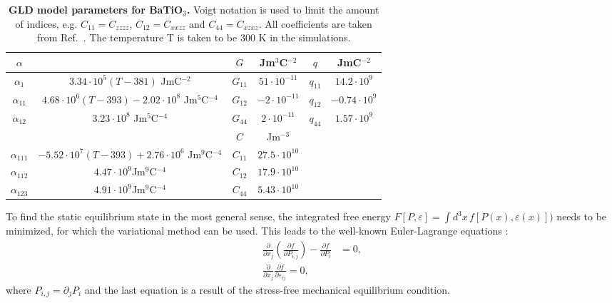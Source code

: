 \begin{table}
\begin{tabular}{|c|c|c|c|c|c|}
	\hline
	 $\alpha$ & & $G$ & Jm$^3$C$^{-2}$& $q$ & JmC$^{-2}$\\
	 \hline
	 $\alpha_1$ & $3.34\cdot 10^5 (T - 381)$  JmC$^{-2}$& $G_{11}$ & $51 \cdot 10^{-11}$ & $q_{11}$ & $14.2 \cdot 10^{9}$ \\
	 $\alpha_{11}$ & $4.68 \cdot 10^6 (T-393) - 2.02 \cdot 10^8$ Jm$^5$C$^{-4}$& $G_{12}$ & $-2 \cdot 10^{-11}$ & $q_{12}$ & $-0.74 \cdot 10^{9}$ \\
	 $\alpha_{12}$ & $3.23 \cdot 10^8$ Jm$^5$C$^{-4}$ & $G_{44}$ & $2 \cdot 10^{-11}$  & $q_{44}$ & $1.57 \cdot 10^{9}$ \\
	 \cline{3-6}
	 & & $C$ &Jm$^{-3}$\\
	 \cline{3-4}
	 $\alpha_{111}$ & $-5.52 \cdot 10^7 (T - 393) + 2.76 \cdot 10^6 $ Jm$^9$C$^{-4}$ & $C_{11}$ & $27.5 \cdot 10^{10}$\\
	 $\alpha_{112}$ &  $4.47 \cdot 10^9 $Jm$^9$C$^{-4}$  & $C_{12}$ & $17.9 \cdot 10^{10}$\\
	 $\alpha_{123}$ & $4.91 \cdot 10^9$Jm$^9$C$^{-4}$  &$C_{44}$ & $5.43 \cdot 10^{10}$\\
	 \cline{1-4}
\end{tabular}
\caption{{\bf \gls{GLD} model parameters for BaTiO$_3$.} Voigt notation \cite{Voigt} is used to limit the amount of indices, e.g. $C_{11} = C_{zzzz}$, $C_{12} = C_{xxzz}$ and $C_{44}= C_{xzxz}$.  All coefficients are taken from Ref.~\cite{Marton2010}. The temperature T is taken to be 300 K in the simulations.\label{tab:BTO_param}}
\end{table}
To find the static equilibrium state in the most general sense, the integrated free energy $F[P,\varepsilon] = \int d^3x \,f[P(x), \varepsilon(x)])$ needs to be minimized, for which the variational method can be used.
This leads to the well-known Euler-Lagrange equations \cite{Cao1991, Marton2010}:
\begin{align}
	\label{eq:BTO_euler}
	\frac{\partial}{\partial x_j}\left( \frac{\partial f}{\partial P_{i,j}}\right) - \frac{\partial f}{\partial P_i} &= 0, \\
	\frac{\partial}{\partial x_j}\frac{\partial f}{\partial \varepsilon_{ij}} = 0,
\end{align}
where $P_{i,j} = \partial_j P_i$ and the last equation is a result of the stress-free mechanical equilibrium condition.

